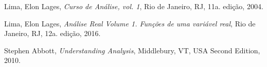 \documentclass[main.tex]{subfiles}
\begin{document}
\begin{thebibliography}{9}

  Lima, Elon Lages,
  \emph{Curso de Análise, vol. 1},
  Rio de Janeiro, RJ,
  11a. edição,
  2004.

  Lima, Elon Lages,
  \emph{Análise Real Volume 1. Funções de uma variável real},
  Rio de Janeiro, RJ,
  12a. edição,
  2016.

  Stephen Abbott,
  \emph{Understanding Analysis},
  Middlebury, VT, USA
  Second Edition,
  2010.

\end{thebibliography}
\end{document}
